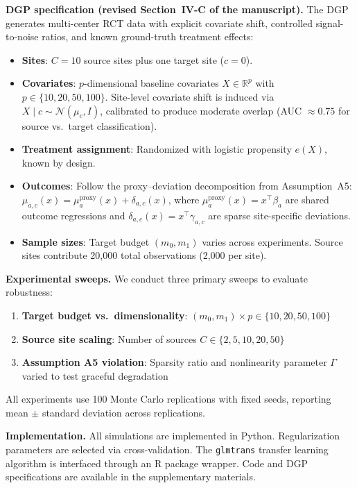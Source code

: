 {\medskip
\noindent\textbf{DGP specification (revised Section~IV-C of the manuscript).}
The DGP generates multi-center RCT data with explicit covariate shift, controlled signal-to-noise ratios, and known ground-truth treatment effects:
\begin{itemize}
\item \textbf{Sites}: $C=10$ source sites plus one target site ($c=0$).
\item \textbf{Covariates}: $p$-dimensional baseline covariates $X \in \mathbb{R}^p$ with $p \in \{10, 20, 50, 100\}$. Site-level covariate shift is induced via $X \mid c \sim \mathcal{N}(\mu_c, I)$, calibrated to produce moderate overlap (AUC $\approx 0.75$ for source vs.\ target classification).
\item \textbf{Treatment assignment}: Randomized with logistic propensity $e(X)$, known by design.
\item \textbf{Outcomes}: Follow the proxy--deviation decomposition from Assumption~A5:
$\mu_{a,c}(x) = \mu^{\mathrm{proxy}}_a(x) + \delta_{a,c}(x)$,
where $\mu^{\mathrm{proxy}}_a(x) = x^\top \beta_a$ are shared outcome regressions and $\delta_{a,c}(x) = x^\top \gamma_{a,c}$ are sparse site-specific deviations.
\item \textbf{Sample sizes}: Target budget $(m_0, m_1)$ varies across experiments. Source sites contribute 20,000 total observations (2,000 per site).
\end{itemize}

\medskip
\noindent\textbf{Experimental sweeps.}
We conduct three primary sweeps to evaluate robustness:
\begin{enumerate}[leftmargin=*]
\item \textbf{Target budget vs.\ dimensionality}: $(m_0, m_1) \times p \in \{10, 20, 50, 100\}$
\item \textbf{Source site scaling}: Number of sources $C \in \{2, 5, 10, 20, 50\}$
\item \textbf{Assumption A5 violation}: Sparsity ratio and nonlinearity parameter $\Gamma$ varied to test graceful degradation
\end{enumerate}
All experiments use 100 Monte Carlo replications with fixed seeds, reporting mean $\pm$ standard deviation across replications.

\medskip
\noindent\textbf{Implementation.}
All simulations are implemented in Python. Regularization parameters are selected via cross-validation. The \texttt{glmtrans} transfer learning algorithm is interfaced through an R package wrapper. Code and DGP specifications are available in the supplementary materials.
}


\clearpage